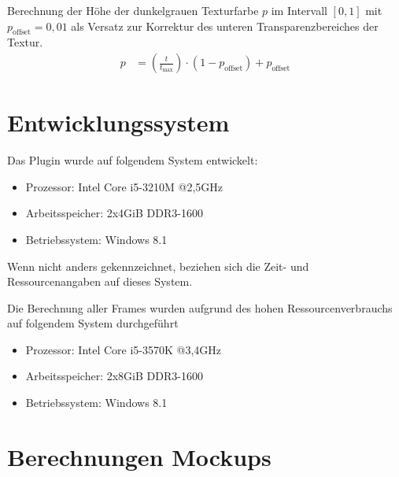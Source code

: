 Berechnung der Höhe der dunkelgrauen Texturfarbe $p$ im Intervall $[0,1]$ mit $p_{\text{offset}} = 0,01$ als Versatz zur Korrektur des unteren Transparenzbereiches der Textur. %
\begin{equation}
\begin{aligned}\label{eq:berechnungen:glyph-textur}
p &= \left(\frac{t}{t_{\text{max}}}\right) \cdot (1 - p_{\text{offset}}) + p_{\text{offset}}
\end{aligned}
\end{equation}

\section{Entwicklungssystem}\label{sec:hardware}
Das Plugin wurde auf folgendem System entwickelt:
\begin{itemize}
	\item Prozessor: Intel Core i5-3210M @2,5GHz
	\item Arbeitsspeicher: 2x4GiB DDR3-1600
	\item Betriebssystem: Windows 8.1
\end{itemize}
Wenn nicht anders gekennzeichnet, beziehen sich die Zeit- und Ressourcenangaben auf dieses System.

Die Berechnung aller Frames wurden aufgrund des hohen Ressourcenverbrauchs auf folgendem System durchgeführt
\begin{itemize}
	\item Prozessor: Intel Core i5-3570K @3,4GHz
	\item Arbeitsspeicher: 2x8GiB DDR3-1600
	\item Betriebssystem: Windows 8.1
\end{itemize}

\section{Berechnungen Mockups}\label{sec:mockups:berechnungen}

